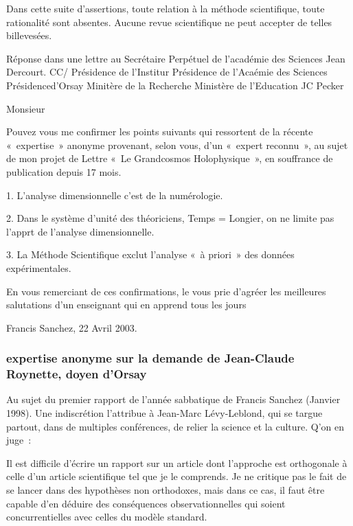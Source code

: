 \documentclass[a4paper,12pt]{article}
\begin{document}
Dans cette suite d’assertions, toute relation à la méthode scientifique, toute rationalité sont absentes. Aucune revue scientifique ne peut accepter de telles billevesées.



Réponse dans une lettre au Secrétaire Perpétuel de l’académie des Sciences Jean Dercourt.
CC/ Présidence de l’Institur
Présidence de l’Acaémie des Sciences
Présidenced’Orsay
Minitère de la Recherche
Ministère de l’Education
JC Pecker

Monsieur

Pouvez vous me confirmer les points suivants qui ressortent de la récente « expertise » anonyme provenant, selon vous, d’un « expert reconnu », au sujet de mon projet de Lettre « Le Grandcosmos Holophysique », en souffrance de publication depuis 17 mois.

1. L’analyse dimensionnelle c’est de la numérologie.

2. Dans le système d’unité des théoriciens,  Temps = Longier, on ne limite pas l’apprt de l’analyse dimensionnelle.

3. La Méthode Scientifique exclut l’analyse « à priori » des données expérimentales.

En vous remerciant de ces confirmations, le vous prie d’agréer les meilleures salutations d’un enseignant qui en apprend tous les jours

Francis Sanchez, 22 Avril 2003.


\subsubsection{expertise anonyme sur la demande de Jean-Claude Roynette, doyen d’Orsay} 

Au sujet du premier rapport de l’année sabbatique de Francis Sanchez (Janvier 1998). Une indiscrétion l’attribue à Jean-Marc Lévy-Leblond, qui se targue partout, dans de multiples conférences, de relier la science et la culture. Q’on en juge :

Il est difficile d’écrire un rapport sur un article dont l’approche est orthogonale à celle d’un article scientifique tel que je le comprends. Je ne critique pas le fait de se lancer dans des hypothèses non orthodoxes, mais dans ce cas, il faut être capable d’en déduire des conséquences observationnelles qui soient concurrentielles avec celles du modèle standard.
\end{document}
